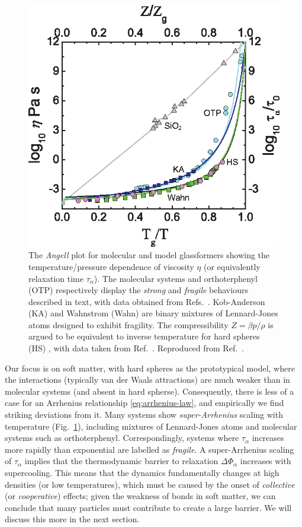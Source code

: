 \documentclass[11pt,twoside]{report}
\begin{document}
\begin{figure}
  \includegraphics[width=0.9\linewidth,outer]{angell}
  \caption[The Angell plot for model systems undergoing dynamical arrest]{
    The \emph{Angell} plot \cite{AngellJNS1988} for molecular and model glassformers showing the temperature/pressure dependence of viscosity $\eta$ (or equivalently relaxation time $\tau_\alpha$).
    The molecular systems  and orthoterphenyl (OTP) respectively display the \emph{strong} and \emph{fragile} behaviours described in text, with data obtained from Refs.\ \cite{AngellS1995, BerthierPRE2009}.
    Kob-Anderson (KA) and Wahnstrom (Wahn) are binary mixtures of Lennard-Jones atoms designed to exhibit fragility.
    The compressibility $Z = \beta p / \rho$ is argued to be equivalent to inverse temperature for hard spheres (HS) \cite{BerthierPRE2009}, with data taken from Ref.\ \cite{RoyallJSM2017}.
    Reproduced from Ref.\ \cite{RoyallPR2015}.
  }
  \label{fig:angell}
\end{figure}

Our focus is on soft matter, with hard spheres as the prototypical model, where the  interactions (typically van der Waals attractions) are much weaker than in molecular systems (and absent in hard spherse).
Consequently, there is less of a case for an Arrhenius relationship \eqref{eq:arrhenius-law}, and empirically we find striking deviations from it.
Many systems show \emph{super-Arrhenius} scaling with temperature (Fig.\ \ref{fig:angell}), including mixtures of Lennard-Jones atoms and molecular systems such as orthoterphenyl.
Correspondingly, systems where $\tau_\alpha$ increases more rapidly than exponential are labelled as \emph{fragile}.
A super-Arrhenius scaling of $\tau_\alpha$ implies that the thermodynamic barrier to relaxation $\Delta \Phi_\alpha$ increases with supercooling.
This means that the dynamics fundamentally changes at high densities (or low temperatures), which must be caused by the onset of \emph{collective} (or \emph{cooperative}) effects; given the weakness of bonds in soft matter, we can conclude that many particles must contribute to create a large barrier.
We will discuss this more in the next section.
\end{document}
